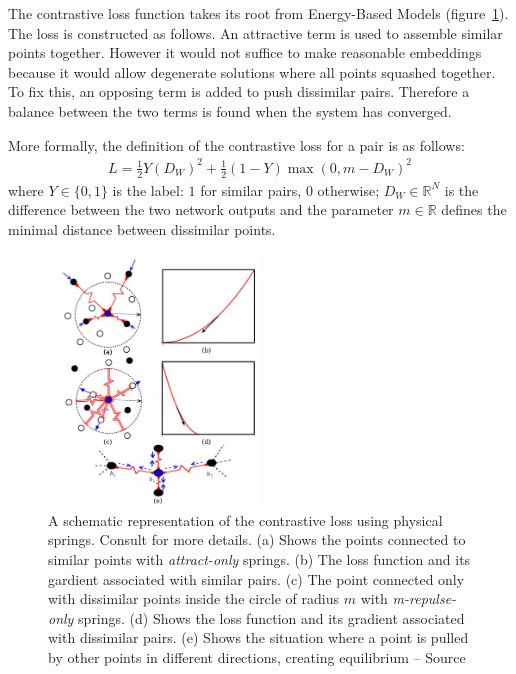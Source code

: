 \documentclass[a4paper,12pt]{report}
\newcommand{\R}{\mathbb{R}}
\begin{document}
The contrastive loss function takes its root from Energy-Based Models (figure~\ref{fig:contrastive_spring}).
The loss is constructed as follows.
An attractive term is used to assemble similar points together.
However it would not suffice to make reasonable embeddings because it would allow degenerate solutions where all points squashed together.
To fix this, an opposing term is added to push dissimilar pairs.
Therefore a balance between the two terms is found when the system has converged.

More formally, the definition of the contrastive loss for a pair is as follows:
\begin{eqnarray}
    L = \frac{1}{2} Y (D_W)^2 + \frac{1}{2} (1-Y) \max(0, m - D_W)^2
\end{eqnarray}
where $Y \in \{0,1\}$ is the label: $1$ for similar pairs, $0$ otherwise; $D_W \in \R^N$ is the difference between the two network outputs and the parameter $m \in \R$ defines the minimal distance between dissimilar points.

\begin{figure}[t]
    \begin{center}
        \includegraphics[width=0.5\textwidth]{thesis_figures/contrastive_spring.jpg}
    \end{center}
    \caption{A schematic representation of the contrastive loss using physical springs. Consult \cite{hadsell2006dimensionality} for more details. (a) Shows the points connected to similar points with {\em attract-only} springs. (b) The loss function and its gardient associated with similar pairs. (c) The point connected only with dissimilar points inside the circle of radius $m$ with {\em m-repulse-only} springs. (d) Shows the loss function and its gradient associated with dissimilar pairs. (e) Shows the situation where a point is pulled by other points in different directions, creating equilibrium -- Source \cite{hadsell2006dimensionality}}
    \label{fig:contrastive_spring}
\end{figure}
\end{document}
